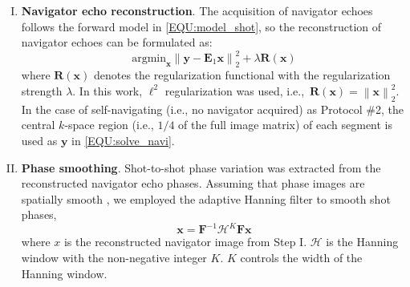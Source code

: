 \documentclass[preprint,12pt,authoryear,review]{elsarticle}
\begin{document}
    \begin{enumerate}[I.]
        \item \textbf{Navigator echo reconstruction}.
        The acquisition of navigator echoes follows the forward model
        in \cref{EQU:model_shot}, so the reconstruction of navigator echoes
        can be formulated as:
        \begin{equation}
            \mathrm{argmin}_\mathbf{x} \left\| \mathbf{y} - \mathbf{E}_1 \mathbf{x} \right\|_2^2
            + \lambda \mathbf{R}(\mathbf{x})
            \label{EQU:solve_navi}
        \end{equation}
    	where $\mathbf{R}(\mathbf{x})$ denotes the regularization functional
    	with the regularization strength $\lambda$.
    	In this work, $\ell^2$ regularization was used,
    	i.e.,~$\mathbf{R}(\mathbf{x}) = \left\lVert \mathbf{x} \right\rVert_2^2$.
        In the case of self-navigating
        (i.e., no navigator acquired) as Protocol \#2,
        the central $k$-space region (i.e., $1/4$ of the full image matrix)
        of each segment is used as $\mathbf{y}$ in \cref{EQU:solve_navi}.


        \item \textbf{Phase smoothing}.
        Shot-to-shot phase variation was extracted from
        the reconstructed navigator echo phases.
        Assuming that phase images are spatially smooth
        \citep{chen_2013_muse,dai_2023_julep},
        we employed the adaptive Hanning filter to smooth shot phases,
        \begin{equation}
        	\mathbf{x} = \mathbf{F}^{-1} \mathcal{H}^K \mathbf{F} \mathbf{x}
        	\label{EQU:ITER_PHASE}
        \end{equation}
    	where $x$ is the reconstructed navigator image from Step I.
    	$\mathcal{H}$ is the Hanning window
        with the non-negative integer $K$.
        $K$ controls the width of the Hanning window.


\end{enumerate}
\end{document}
